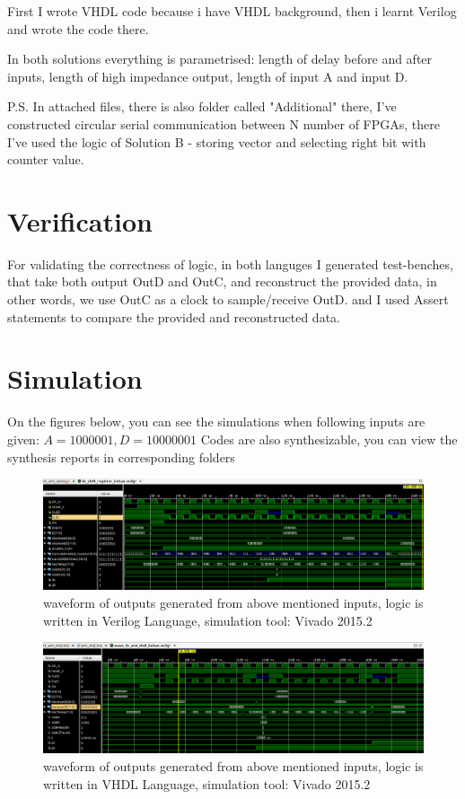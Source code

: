 \documentclass{article}
\begin{document}
First I wrote VHDL code because i have VHDL background, then i learnt Verilog and wrote the code there.

In both solutions everything is parametrised: length of delay before and after inputs, length of high impedance output, length of input A and input D.

P.S.
In attached files, there is also folder called "Additional" there, I've constructed circular serial communication between N number of FPGAs, there I've used the logic of Solution B - storing vector and selecting right bit with counter value.

\section{Verification}
For validating the correctness of logic, in both languges I generated test-benches, that take both output OutD and OutC, and reconstruct the provided data, in other words, we use OutC as a clock to sample/receive OutD. and I used Assert statements to compare the provided and reconstructed data.

\section{Simulation}
On the figures below, you can see the simulations when following inputs are given:
$A = 1000001, D = 10000001$
Codes are also synthesizable, you can view the synthesis reports in corresponding folders

\begin{figure}[H]
\centering
\includegraphics[width=\textwidth] {tb_verilog.png}
\caption{waveform of outputs generated from above mentioned inputs, logic is written in Verilog Language, simulation tool: Vivado 2015.2}
\label{fig:tb_verilog}
\end{figure}

\begin{figure}[H]
\centering
\includegraphics[width=\textwidth] {tb_vhdl.png}
\caption{waveform of outputs generated from above mentioned inputs, logic is written in VHDL Language, simulation tool: Vivado 2015.2}
\label{fig:tb_vhdl}
\end{figure}
\end{document}
